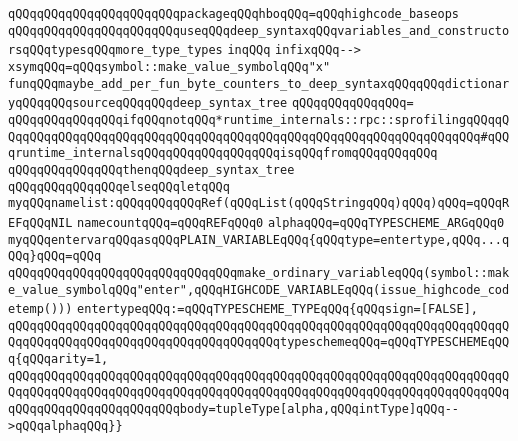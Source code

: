 \verb|qQQqqQQqqQQqqQQqqQQqqQQqpackageqQQqhboqQQq=qQQqhighcode_baseops|\newline
\verb|qQQqqQQqqQQqqQQqqQQqqQQquseqQQqdeep_syntaxqQQqvariables_and_constructorsqQQqtypesqQQqmore_type_types|\newline
\verb|inqQQq|\newline
\newline
\verb|infixqQQq-->|\newline
\verb|xsymqQQq=qQQqsymbol::make_value_symbolqQQq"x"|\newline
\newline
\verb|funqQQqmaybe_add_per_fun_byte_counters_to_deep_syntaxqQQqqQQqdictionaryqQQqqQQqsourceqQQqqQQqdeep_syntax_tree|\newline
\verb|qQQqqQQqqQQqqQQq=|\newline
\verb|qQQqqQQqqQQqqQQqifqQQqnotqQQq*runtime_internals::rpc::sprofilingqQQqqQQqqQQqqQQqqQQqqQQqqQQqqQQqqQQqqQQqqQQqqQQqqQQqqQQqqQQqqQQqqQQqqQQq#qQQqruntime_internalsqQQqqQQqqQQqqQQqqQQqisqQQqfromqQQqqQQqqQQq|\newline
\verb|qQQqqQQqqQQqqQQqthenqQQqdeep_syntax_tree|\newline
\verb|qQQqqQQqqQQqqQQqelseqQQqletqQQq|\newline
\newline
\verb|myqQQqnamelist:qQQqqQQqqQQqRef(qQQqList(qQQqStringqQQq)qQQq)qQQq=qQQqREFqQQqNIL|\newline
\verb|namecountqQQq=qQQqREFqQQq0|\newline
\newline
\verb|alphaqQQq=qQQqTYPESCHEME_ARGqQQq0|\newline
\newline
\verb|myqQQqentervarqQQqasqQQqPLAIN_VARIABLEqQQq{qQQqtype=entertype,qQQq...qQQq}qQQq=qQQq|\newline
\verb|qQQqqQQqqQQqqQQqqQQqqQQqqQQqqQQqmake_ordinary_variableqQQq(symbol::make_value_symbolqQQq"enter",qQQqHIGHCODE_VARIABLEqQQq(issue_highcode_codetemp()))|\newline
\verb|entertypeqQQq:=qQQqTYPESCHEME_TYPEqQQq{qQQqsign=[FALSE],|\newline
\verb|qQQqqQQqqQQqqQQqqQQqqQQqqQQqqQQqqQQqqQQqqQQqqQQqqQQqqQQqqQQqqQQqqQQqqQQqqQQqqQQqqQQqqQQqqQQqqQQqqQQqqQQqqQQqtypeschemeqQQq=qQQqTYPESCHEMEqQQq{qQQqarity=1,|\newline
\verb|qQQqqQQqqQQqqQQqqQQqqQQqqQQqqQQqqQQqqQQqqQQqqQQqqQQqqQQqqQQqqQQqqQQqqQQqqQQqqQQqqQQqqQQqqQQqqQQqqQQqqQQqqQQqqQQqqQQqqQQqqQQqqQQqqQQqqQQqqQQqqQQqqQQqqQQqqQQqqQQqqQQqbody=tupleType[alpha,qQQqintType]qQQq-->qQQqalphaqQQq}}|\newline
